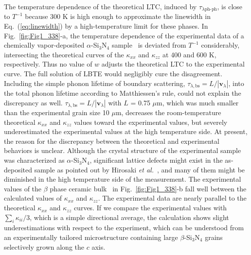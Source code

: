 \documentclass[twocolumn,amsmath,amssymb,a4paper,prb,superscriptaddress,floatfix]{revtex4-1}
\begin{document}
The temperature dependence of the theoretical LTC, induced by
$\tau_{\lambda\text{ph-ph}}$, is close to $T^{-1}$ because 300 K is high enough
to approximate the linewidth in Eq.~(\ref{eq:linewidth}) by a high-temperature
limit for these phases.  In Fig.~\ref{fig:Fig1_338}-a, the temperature
dependence of the experimental data of a chemically vapor-deposited
$\alpha$-Si$_3$N$_4$ sample~\cite{hirai} is deviated from $T^{-1}$
considerably, intersecting the theoretical curves of the $\kappa$$_{xx}$ and
$\kappa$$_{zz}$ at 400 and 600 K, respectively.  Thus no value of $w$ adjusts
the theoretical LTC to the experimental curve.  The full solution of LBTE would
negligibly cure the disagreement.  Including the simple phonon lifetime of
boundary scattering, $\tau_{\lambda,\text{bs}}=L/|\mathbf{v}_\lambda|$, into
the total phonon lifetime according to Matthiessen's rule, could not explain
the discrepancy as well.  $\tau_{\lambda,\text{bs}}=L/|\mathbf{v}_\lambda|$
with $L$ = 0.75 $\mu\text{m}$, which was much smaller than the experimental
grain size 10 $\mu\text{m}$, decreases the room-temperature theoretical
$\kappa$$_{xx}$ and $\kappa$$_{zz}$ values toward the experimental values, but
severely underestimated the experimental values at the high temperature side.
At present, the reason for the discrepancy between the theoretical and
experimental behaviors is unclear.  Although the crystal structure of the
experimental sample was characterized as $\alpha$-Si$_3$N$_4$, significant
lattice defects might exist in the as-deposited sample as pointed out by
Hirosaki {\it et al.}~\cite{hirosaki-md}, and many of them might be diminished
in the high temperature side of the measurement.
The experimental values of the $\beta$ phase ceramic bulk~\cite{hirosaki} in
Fig.~\ref{fig:Fig1_338}-b fall well between the calculated values of
$\kappa$$_{xx}$ and  $\kappa$$_{zz}$.  The experimental data are nearly
parallel to the theoretical $\kappa$$_{xx}$ and  $\kappa$$_{zz}$ curves.  If we
compare the experimental values with $\sum_i \kappa_{ii}/3$, which is a simple
directional average, the calculation shows slight underestimations with respect
to the experiment, which can be understood from an experimentally tailored
microstructure containing large $\beta$-Si$_3$N$_4$ grains selectively grown
along the $c$ axis.~\cite{hirosaki}
\end{document}
